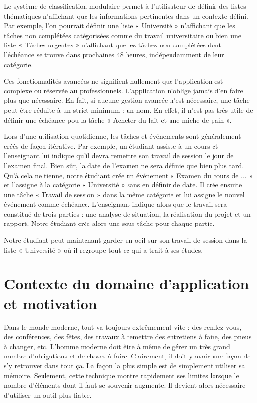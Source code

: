 \documentclass[letterpaper, oneside, 12pt,these,creativecommons]{thETS}
\begin{document}
Le système de classification modulaire permet à l'utilisateur de définir des listes thématiques n'affichant que les informations pertinentes dans un contexte défini. Par exemple, l'on pourrait définir une liste « Université » n'affichant que les tâches non complétées catégorisées comme du travail universitaire ou bien une liste « Tâches urgentes » n'affichant que les tâches non complétées dont l'échéance se trouve dans prochaines 48 heures, indépendamment de leur catégorie.

Ces fonctionnalités avancées ne signifient nullement que l'application est complexe ou réservée au professionnels. L'application n'oblige jamais d'en faire plus que nécessaire. En fait, si aucune gestion avancée n'est nécessaire, une tâche peut être réduite à un strict minimum : un nom. En effet, il n'est pas très utile de définir une échéance pou la tâche « Acheter du lait et une miche de pain ».

Lors d'une utilisation quotidienne, les tâches et événements sont généralement créés de façon itérative. Par exemple, un étudiant assiste à un cours et l'enseignant lui indique qu'il devra remettre son travail de session le jour de l'examen final. Bien sûr, la date de l'examen ne sera définie que bien plus tard. Qu'à cela ne tienne, notre étudiant crée un événement « Examen du cours de ... » et l'assigne à la catégorie « Université » sans en définir de date. Il crée ensuite une tâche « Travail de session » dans la même catégorie et lui assigne le nouvel événement comme échéance. L'enseignant indique alors que le travail sera constitué de trois parties : une analyse de situation, la réalisation du projet et un rapport. Notre étudiant crée alors une sous-tâche pour chaque partie.

Notre étudiant peut maintenant garder un oeil sur son travail de session dans la liste « Université » où il regroupe tout ce qui a trait à ses études.

\section{Contexte du domaine d’application et motivation}

Dans le monde moderne, tout va toujours extrêmement vite : des rendez-vous, des conférences, des fêtes, des travaux à remettre des entretiens à faire, des pneus à changer, etc. L'homme moderne doit être à même de gérer un très grand nombre d'obligations et de choses à faire. Clairement, il doit y avoir une façon de s'y retrouver dans tout ça. La façon la plus simple est de simplement utiliser sa mémoire. Seulement, cette technique montre rapidement ses limites lorsque le nombre d'éléments dont il faut se souvenir augmente. Il devient alors nécessaire d'utiliser un outil plus fiable.
\end{document}
